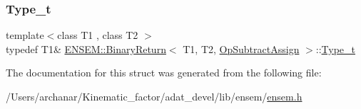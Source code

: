 \mbox{\label{structENSEM_1_1BinaryReturn_3_01T1_00_01T2_00_01OpSubtractAssign_01_4_a21f38c2ce7ac4f73a438d38f65705fe7}} 
\subsubsection{\texorpdfstring{Type\_t}{Type\_t}\hspace{0.1cm}{\footnotesize\ttfamily [2/2]}}
{\footnotesize\ttfamily template$<$class T1 , class T2 $>$ \\
typedef T1\& \mbox{\hyperlink{structENSEM_1_1BinaryReturn}{E\+N\+S\+E\+M\+::\+Binary\+Return}}$<$ T1, T2, \mbox{\hyperlink{structENSEM_1_1OpSubtractAssign}{Op\+Subtract\+Assign}} $>$\+::\mbox{\hyperlink{structENSEM_1_1BinaryReturn_3_01T1_00_01T2_00_01OpSubtractAssign_01_4_a21f38c2ce7ac4f73a438d38f65705fe7}{Type\+\_\+t}}}



The documentation for this struct was generated from the following file\+:\begin{DoxyCompactItemize}
\item 
/\+Users/archanar/\+Kinematic\+\_\+factor/adat\+\_\+devel/lib/ensem/\mbox{\hyperlink{lib_2ensem_2ensem_8h}{ensem.\+h}}\end{DoxyCompactItemize}
